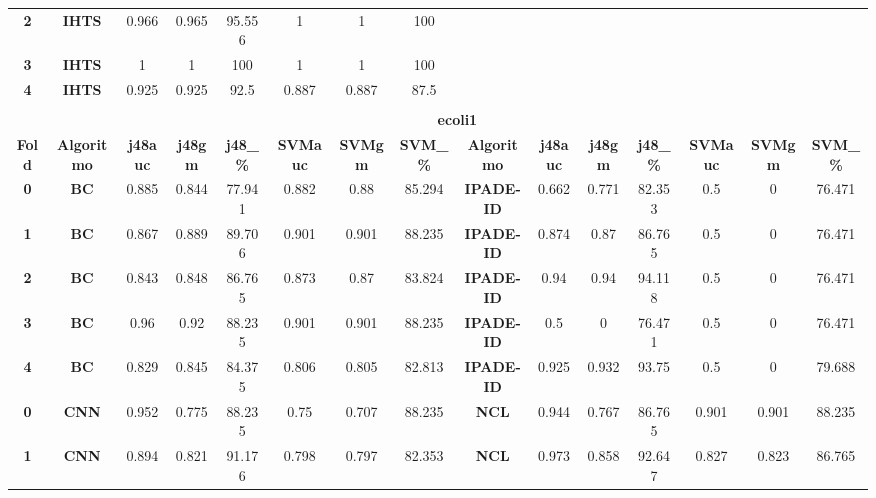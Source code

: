 {{\begin{tabular}{c|c|cccccc|ccccccc}
\textbf{2} & \textbf{IHTS} & 0.966 & 0.965 & 95.556 & 1     & 1     & 100   &       &       &       &       &       &       &  \\
\textbf{3} & \textbf{IHTS} & 1     & 1     & 100   & 1     & 1     & 100   &       &       &       &       &       &       &  \\
\textbf{4} & \textbf{IHTS} & 0.925 & 0.925 & 92.5  & 0.887 & 0.887 & 87.5  &       &       &       &       &       &       &  \\
\multicolumn{1}{c}{} & \multicolumn{1}{c}{} &       &       &       &       &       & \multicolumn{1}{c}{} &       &       &       &       &       &       &  \\
\multicolumn{1}{c}{} & \multicolumn{14}{c}{\textbf{ecoli1}} \\
\midrule
\textbf{Fold} & \textbf{Algoritmo} & \textbf{j48auc} & \textbf{j48gm} & \textbf{j48\_\%} & \textbf{SVMauc} & \textbf{SVMgm} & \textbf{SVM\_\%} & \multicolumn{1}{c|}{\textbf{Algoritmo}} & \textbf{j48auc} & \textbf{j48gm} & \textbf{j48\_\%} & \textbf{SVMauc} & \textbf{SVMgm} & \textbf{SVM\_\%} \\
\midrule
\textbf{0} & \textbf{BC} & 0.885 & 0.844 & 77.941 & 0.882 & 0.88  & 85.294 & \multicolumn{1}{c|}{\textbf{IPADE-ID}} & 0.662 & 0.771 & 82.353 & 0.5   & 0     & 76.471 \\
\textbf{1} & \textbf{BC} & 0.867 & 0.889 & 89.706 & 0.901 & 0.901 & 88.235 & \multicolumn{1}{c|}{\textbf{IPADE-ID}} & 0.874 & 0.87  & 86.765 & 0.5   & 0     & 76.471 \\
\textbf{2} & \textbf{BC} & 0.843 & 0.848 & 86.765 & 0.873 & 0.87  & 83.824 & \multicolumn{1}{c|}{\textbf{IPADE-ID}} & 0.94  & 0.94  & 94.118 & 0.5   & 0     & 76.471 \\
\textbf{3} & \textbf{BC} & 0.96  & 0.92  & 88.235 & 0.901 & 0.901 & 88.235 & \multicolumn{1}{c|}{\textbf{IPADE-ID}} & 0.5   & 0     & 76.471 & 0.5   & 0     & 76.471 \\
\textbf{4} & \textbf{BC} & 0.829 & 0.845 & 84.375 & 0.806 & 0.805 & 82.813 & \multicolumn{1}{c|}{\textbf{IPADE-ID}} & 0.925 & 0.932 & 93.75 & 0.5   & 0     & 79.688 \\
\textbf{0} & \textbf{CNN} & 0.952 & 0.775 & 88.235 & 0.75  & 0.707 & 88.235 & \multicolumn{1}{c|}{\textbf{NCL}} & 0.944 & 0.767 & 86.765 & 0.901 & 0.901 & 88.235 \\
\textbf{1} & \textbf{CNN} & 0.894 & 0.821 & 91.176 & 0.798 & 0.797 & 82.353 & \multicolumn{1}{c|}{\textbf{NCL}} & 0.973 & 0.858 & 92.647 & 0.827 & 0.823 & 86.765 \\

\end{tabular}}}
